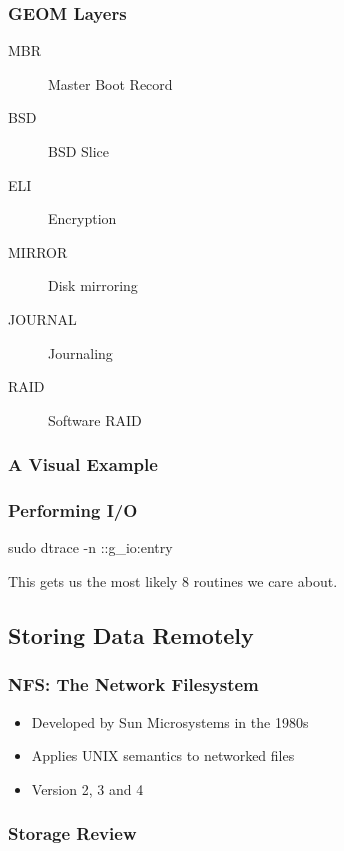\documentclass[pdftex]{beamer} %
\begin{document}
\begin{frame}
  \frametitle{GEOM Layers}
  \begin{description}
  \item[MBR] Master Boot Record
  \item[BSD] BSD Slice
  \item[ELI] Encryption
  \item[MIRROR] Disk mirroring
  \item[JOURNAL] Journaling
  \item[RAID] Software RAID
\end{description}
\end{frame}

\begin{frame}
  \frametitle{A Visual Example}
  
\end{frame}

\begin{frame}
  \frametitle{Performing I/O}
sudo dtrace -n ::g\_io\*:entry  

This gets us the most likely 8 routines we care about.

\end{frame}

\subsection{Storing Data Remotely}
\label{sec:remote_storage}

\begin{frame}
  \frametitle{NFS: The Network Filesystem}
  \begin{itemize}
  \item Developed by Sun Microsystems in the 1980s
  \item Applies UNIX semantics to networked files
  \item Version 2, 3 and 4
  \end{itemize}
\end{frame}

\begin{frame}
  \frametitle{Storage Review}
  
\end{frame}
\end{document}
